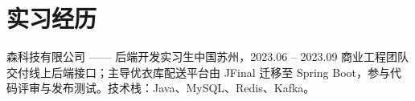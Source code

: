 \section{实习经历}
  \resumeSubHeadingListStart
    \resumeCompact
      {森科技有限公司 —— 后端开发实习生}{中国苏州，2023.06 -- 2023.09}
      {商业工程团队交付线上后端接口；主导优衣库配送平台由 JFinal 迁移至 Spring Boot，参与代码评审与发布测试。技术栈：Java、MySQL、Redis、Kafka。}
  \resumeSubHeadingListEnd
